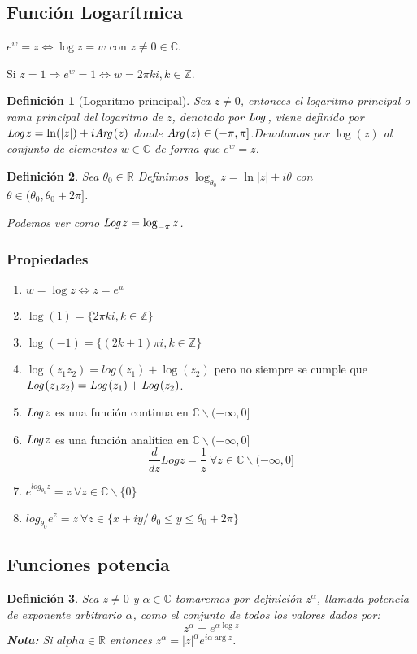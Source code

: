 \documentclass[12pt]{book}
\newtheorem{defi}{Definición}[chapter]
\newcommand{\R}{\mathbb{R}}
\newcommand{\C}{\mathbb{C}}
\newcommand{\Z}{\mathbb{Z}}
\newcommand{\Log}{\emph{Log}\hspace{0.5mm}}
\newcommand{\Arg}{\emph{Arg}\hspace{0.5mm}}
\begin{document}
\subsection{Función Logarítmica}
$e^w = z \Leftrightarrow \log z = w$ con $z \neq 0 \in \C$.

Si $z=1 \Rightarrow e^w = 1 \Leftrightarrow w = 2\pi k i, k \in \Z$.
 
\begin{defi}[Logaritmo principal]
Sea $z\neq 0$, entonces el logaritmo principal o rama principal del logaritmo de $z$, denotado por $\Log$, viene definido por $\Log z = \ln(|z|) + i \Arg(z)$ donde $\Arg(z)\in (-\pi,\pi]$.Denotamos por $\log(z)$ al conjunto de elementos $w \in \C$ de forma que $e^w = z$. 
\end{defi}

\begin{defi}
Sea $\theta_0 \in\R$ Definimos $\log_{\theta_0} z = \ln |z| + i\theta$ con \\$\theta \in (\theta_0,\theta_0+2\pi]$.

Podemos ver como $\Log z = \log_{-\pi} z$.
\end{defi}

\subsubsection*{Propiedades}
\begin{enumerate}
	\item $w=\log z\Leftrightarrow z = e^w$
	\item $\log(1) = \{2\pi ki, k\in\Z \}$
	\item $\log(-1) = \{(2k+1)\pi i, k\in\Z \}$
	\item $\log(z_1z_2) = log(z_1)+\log(z_2)$ pero no siempre se cumple que\\$\Log(z_1z_2) = \Log(z_1) + \Log(z_2)$.
	\item $\Log z$ es una función continua en $\C \backslash (-\infty,0]$
	\item  $\Log z$ es una función analítica en $\C \backslash (-\infty,0]$ 
	$$ \frac{d}{dz}Log z = \frac{1}{z} \ \forall z \in \C \backslash (-\infty,0]$$
	\item $e^{log_{\theta_0} z} = z \ \forall z \in \C \backslash\{0\}$
	\item $log_{\theta_0} e^z=z \ \forall z \in\{x+iy /\ \theta_0 \leq y \leq \theta_0 + 2\pi\}$
\end{enumerate}

\subsection{Funciones potencia}
\begin{defi}
Sea $z\neq 0$ y $\alpha \in\C$ tomaremos por definición $z^\alpha$, llamada potencia de exponente arbitrario $\alpha$, como el conjunto de todos los valores dados por:
$$z^\alpha = e^{\alpha\log z}$$
\textbf{Nota:} Si $alpha \in\R$ entonces $z^\alpha = |z|^\alpha e^{i\alpha\arg z}$.
\end{defi}
\end{document}

